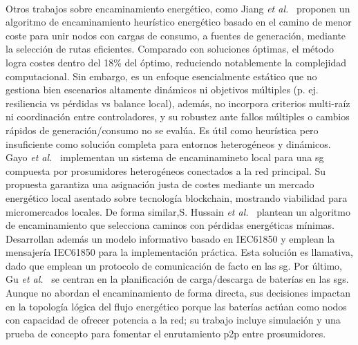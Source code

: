 \\
Otros trabajos sobre encaminamiento energético, como Jiang \textit{et al.}~\cite{Jiang19} proponen un algoritmo de encaminamiento heurístico energético basado en el camino de menor coste para unir nodos con cargas de consumo, a fuentes de generación, mediante la selección de rutas eficientes. Comparado con soluciones óptimas, el método logra costes dentro del 18\% del óptimo, reduciendo notablemente la complejidad computacional. Sin embargo, es un enfoque esencialmente estático que no gestiona bien escenarios altamente dinámicos ni objetivos múltiples (p. ej. resiliencia vs pérdidas vs balance local), además, no incorpora criterios multi-raíz ni coordinación entre controladores, y  su robustez ante fallos múltiples o cambios rápidos de generación/consumo no se evalúa. Es útil como heurística pero insuficiente como solución completa para entornos heterogéneos y dinámicos. Gayo \textit{et al.}~\cite{Gayo20} implementan un sistema de encaminamineto local para una \gls{sg} compuesta por prosumidores heterogéneos conectados a la red principal. Su propuesta garantiza una asignación justa de costes mediante un mercado energético local asentado sobre tecnología blockchain, mostrando viabilidad para micromercados locales. De forma similar,S. Hussain \textit{et al.}~\cite{S-Hussain20} plantean un algoritmo de encaminamiento que selecciona caminos con pérdidas energéticas mínimas. Desarrollan además un modelo informativo basado en IEC61850 y emplean la mensajería IEC61850 para la implementación práctica. Esta solución es llamativa, dado que emplean un protocolo de comunicación de facto en las \gls{sg}. Por último, Gu \textit{et al.}~\cite{Gu22} se centran en la planificación de carga/descarga de baterías en las \glspl{sg}. Aunque no abordan el encaminamiento de forma directa, sus decisiones impactan en la topología lógica del flujo energético porque las baterías actúan como nodos con capacidad de ofrecer potencia a la red; su trabajo incluye simulación y una prueba de concepto para fomentar el enrutamiento \gls{p2p} entre prosumidores.\\
\\
